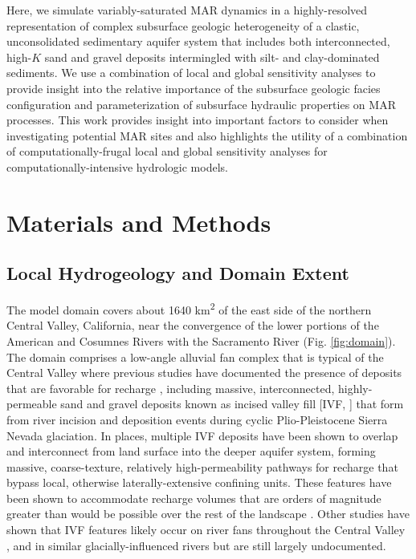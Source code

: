 Here, we simulate variably-saturated MAR dynamics in a highly-resolved representation of complex subsurface geologic heterogeneity of a clastic, unconsolidated sedimentary aquifer system that includes both interconnected, high-$K$ sand and gravel deposits intermingled with silt- and clay-dominated sediments. We use a combination of local and global sensitivity analyses to provide insight into the relative importance of the subsurface geologic facies configuration and parameterization of subsurface hydraulic properties on MAR processes. This work provides insight into important factors to consider when investigating potential MAR sites and also highlights the utility of a combination of computationally-frugal local and global sensitivity analyses for computationally-intensive hydrologic models.


\section{Materials and Methods} \label{sec:MM}
\subsection{Local Hydrogeology and Domain Extent} \label{ssec:MM_hydrogeology}
The model domain covers about 1640 km\textsuperscript{2} of the east side of the northern Central Valley, California, near the convergence of the lower portions of the American and Cosumnes Rivers with the Sacramento River (Fig. \ref{fig:domain}). The domain comprises a low-angle alluvial fan complex that is typical of the Central Valley where previous studies have documented the presence of  deposits that are favorable for recharge \citep{shlemon1967landform,meirovitz2010thesis}, including massive, interconnected, highly-permeable sand and gravel deposits known as incised valley fill [IVF, \citep{weissmann2004influence, weissmann2005factors}] that form from  river incision and deposition events during cyclic Plio-Pleistocene Sierra Nevada glaciation. In places, multiple IVF deposits have been shown to overlap and interconnect from land surface into the deeper aquifer system, forming massive, coarse-texture, relatively high-permeability pathways for recharge that bypass local, otherwise laterally-extensive confining units. These features have been shown to accommodate recharge volumes that are orders of magnitude greater than would be possible over the rest of the landscape \citep{maples_2019}. Other studies have shown that IVF features likely occur on river fans throughout the Central Valley \citep{weissmann2005factors}, and in similar glacially-influenced rivers \citep{pierce1983pleistocene} but are still largely undocumented.

